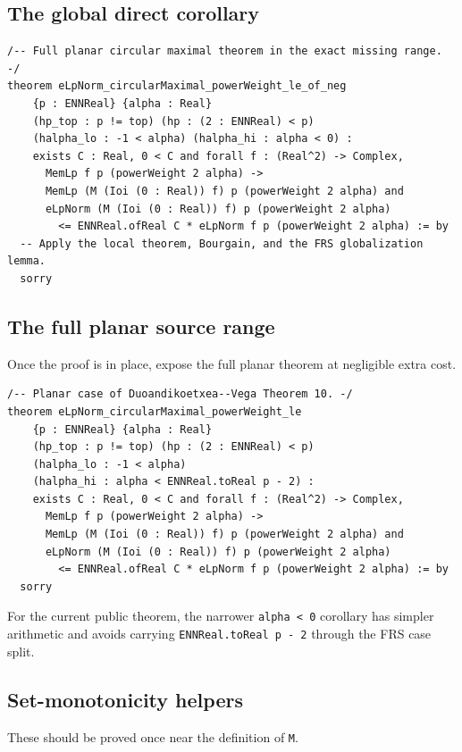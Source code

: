\documentclass[11pt,a4paper]{article}
\theoremstyle{definition}
\theoremstyle{remark}
\newcommand{\lean}{\texttt}
\begin{document}
\subsection{The global direct corollary}

\begin{lstlisting}
/-- Full planar circular maximal theorem in the exact missing range. -/
theorem eLpNorm_circularMaximal_powerWeight_le_of_neg
    {p : ENNReal} {alpha : Real}
    (hp_top : p != top) (hp : (2 : ENNReal) < p)
    (halpha_lo : -1 < alpha) (halpha_hi : alpha < 0) :
    exists C : Real, 0 < C and forall f : (Real^2) -> Complex,
      MemLp f p (powerWeight 2 alpha) ->
      MemLp (M (Ioi (0 : Real)) f) p (powerWeight 2 alpha) and
      eLpNorm (M (Ioi (0 : Real)) f) p (powerWeight 2 alpha)
        <= ENNReal.ofReal C * eLpNorm f p (powerWeight 2 alpha) := by
  -- Apply the local theorem, Bourgain, and the FRS globalization lemma.
  sorry
\end{lstlisting}

\subsection{The full planar source range}

Once the proof is in place, expose the full planar theorem at negligible extra
cost.

\begin{lstlisting}
/-- Planar case of Duoandikoetxea--Vega Theorem 10. -/
theorem eLpNorm_circularMaximal_powerWeight_le
    {p : ENNReal} {alpha : Real}
    (hp_top : p != top) (hp : (2 : ENNReal) < p)
    (halpha_lo : -1 < alpha)
    (halpha_hi : alpha < ENNReal.toReal p - 2) :
    exists C : Real, 0 < C and forall f : (Real^2) -> Complex,
      MemLp f p (powerWeight 2 alpha) ->
      MemLp (M (Ioi (0 : Real)) f) p (powerWeight 2 alpha) and
      eLpNorm (M (Ioi (0 : Real)) f) p (powerWeight 2 alpha)
        <= ENNReal.ofReal C * eLpNorm f p (powerWeight 2 alpha) := by
  sorry
\end{lstlisting}

For the current public theorem, the narrower \lean{alpha < 0} corollary has
simpler arithmetic and avoids carrying \lean{ENNReal.toReal p - 2} through the
FRS case split.

\subsection{Set-monotonicity helpers}

These should be proved once near the definition of \lean{M}.
\end{document}
